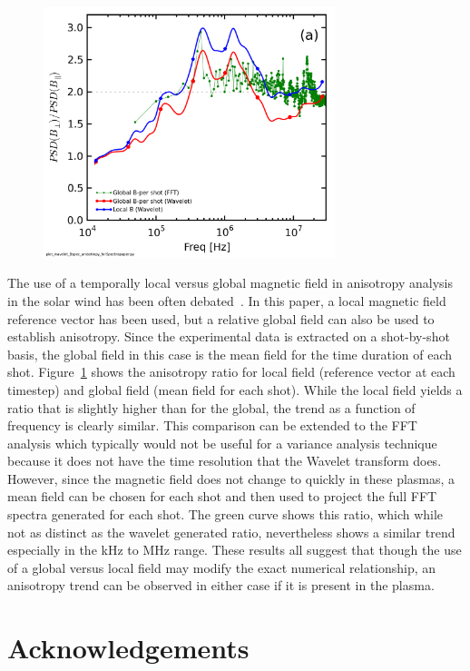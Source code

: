 \documentclass[aip,prl,amsmath,amssymb,reprint,superscriptaddress]{revtex4-1} %
\begin{document}
\begin{figure}[!htbp]
\centerline{
\includegraphics[width=8.5cm]{BperpparaGlobalBcomp_chan1t4_1mWbspectra}}
\caption{\label{fig:globalcomparison}}
\end{figure}

The use of a temporally local versus global magnetic field in anisotropy analysis in the solar wind has been often debated~\cite{podesta09,matthaeus12}. In this paper, a local magnetic field reference vector has been used, but a relative global field can also be used to establish anisotropy. Since the experimental data is extracted on a shot-by-shot basis, the global field in this case is the mean field for the time duration of each shot. Figure~\ref{fig:globalcomparison} shows the anisotropy ratio for local field (reference vector at each timestep) and global field (mean field for each shot). While the local field yields a ratio that is slightly higher than for the global, the trend as a function of frequency is clearly similar. This comparison can be extended to the FFT analysis which typically would not be useful for a variance analysis technique because it does not have the time resolution that the Wavelet transform does. However, since the magnetic field does not change to quickly in these plasmas, a mean field can be chosen for each shot and then used to project the full FFT spectra generated for each shot. The green curve shows this ratio, which while not as distinct as the wavelet generated ratio, nevertheless shows a similar trend especially in the kHz to MHz range. These results all suggest that though the use of a global versus local field may modify the exact numerical relationship, an anisotropy trend can be observed in either case if it is present in the plasma.
\section*{Acknowledgements}
\end{document}
